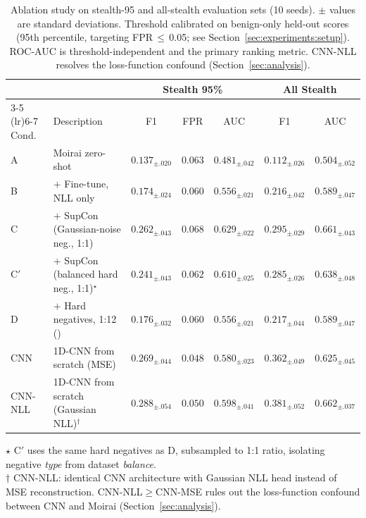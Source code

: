 
\begin{table}[h]
\centering
\caption{
  Ablation study on stealth-95 and all-stealth evaluation sets (10 seeds).
  $\pm$ values are standard deviations.
  Threshold calibrated on benign-only held-out scores
  (95th percentile, targeting FPR\,$\leq$\,0.05;
  see Section~\ref{sec:experiments:setup}).
  ROC-AUC is threshold-independent and the primary ranking metric.
  CNN-NLL resolves the loss-function confound (Section~\ref{sec:analysis}).
}
\label{tab:ablation}
\begin{tabular}{llccccc}
\toprule
& & \multicolumn{3}{c}{Stealth 95\%} & \multicolumn{2}{c}{All Stealth} \\
\cmidrule(lr){3-5} \cmidrule(lr){6-7}
Cond. & Description & F1 & FPR & AUC & F1 & AUC \\
\midrule
A      & Moirai zero-shot                                   & $0.137_{\pm.020}$ & $0.063$ & $0.481_{\pm.042}$ & $0.112_{\pm.026}$ & $0.504_{\pm.052}$ \\
B      & $+$ Fine-tune, NLL only                            & $0.174_{\pm.024}$ & $0.060$ & $0.556_{\pm.021}$ & $0.216_{\pm.042}$ & $0.589_{\pm.047}$ \\
C      & $+$ SupCon (Gaussian-noise neg., 1:1)              & $\mathbf{0.262}_{\pm.043}$ & $0.068$ & $\mathbf{0.629}_{\pm.022}$ & $0.295_{\pm.029}$ & $0.661_{\pm.043}$ \\
C$'$   & $+$ SupCon (balanced hard neg., 1:1)$^\star$       & $0.241_{\pm.043}$ & $0.062$ & $0.610_{\pm.025}$ & $0.285_{\pm.026}$ & $0.638_{\pm.048}$ \\
D      & $+$ Hard negatives, 1:12 (\ours{})                 & $0.176_{\pm.032}$ & $0.060$ & $0.556_{\pm.021}$ & $0.217_{\pm.044}$ & $0.589_{\pm.047}$ \\
\midrule
CNN    & 1D-CNN from scratch (MSE)                          & $0.269_{\pm.044}$ & $0.048$ & $0.580_{\pm.023}$ & $0.362_{\pm.049}$ & $0.625_{\pm.045}$ \\
CNN-NLL & 1D-CNN from scratch (Gaussian NLL)$^\dagger$      & $0.288_{\pm.054}$ & $0.050$ & $0.598_{\pm.041}$ & $\mathbf{0.381}_{\pm.052}$ & $\mathbf{0.662}_{\pm.037}$ \\
\bottomrule
\end{tabular}
\vspace{2pt}
\begin{flushleft}
\footnotesize
$\star$ C$'$ uses the same hard negatives as D, subsampled to 1:1 ratio, isolating negative \emph{type} from dataset \emph{balance}. \\
$\dagger$ CNN-NLL: identical CNN architecture with Gaussian NLL head instead of MSE reconstruction.
CNN-NLL$\geq$CNN-MSE rules out the loss-function confound between CNN and Moirai (Section~\ref{sec:analysis}).
\end{flushleft}
\end{table}

